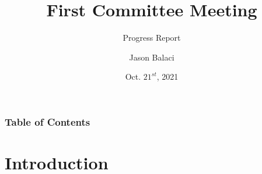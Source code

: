 \documentclass{beamer}
\title[Committee Meeting 1]{First Committee Meeting}
\subtitle{Progress Report}
\author{Jason Balaci}
\institute{McMaster University}
\date{Oct. $21^{st}$, 2021}
\begin{document}
\frame{\titlepage}


\begin{frame}
\frametitle{Table of Contents}
\tableofcontents
\end{frame}

\section{Introduction}
\end{document}
